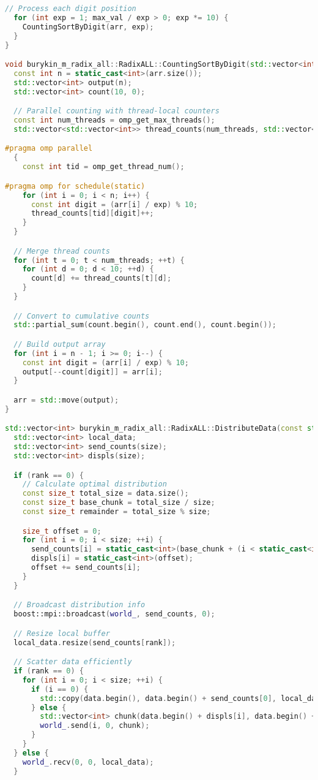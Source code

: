 \documentclass[12pt]{article}
\begin{document}
\begin{lstlisting}[language=C++]
  // Process each digit position
  for (int exp = 1; max_val / exp > 0; exp *= 10) {
    CountingSortByDigit(arr, exp);
  }
}

void burykin_m_radix_all::RadixALL::CountingSortByDigit(std::vector<int>& arr, int exp) {
  const int n = static_cast<int>(arr.size());
  std::vector<int> output(n);
  std::vector<int> count(10, 0);

  // Parallel counting with thread-local counters
  const int num_threads = omp_get_max_threads();
  std::vector<std::vector<int>> thread_counts(num_threads, std::vector<int>(10, 0));

#pragma omp parallel
  {
    const int tid = omp_get_thread_num();

#pragma omp for schedule(static)
    for (int i = 0; i < n; i++) {
      const int digit = (arr[i] / exp) % 10;
      thread_counts[tid][digit]++;
    }
  }

  // Merge thread counts
  for (int t = 0; t < num_threads; ++t) {
    for (int d = 0; d < 10; ++d) {
      count[d] += thread_counts[t][d];
    }
  }

  // Convert to cumulative counts
  std::partial_sum(count.begin(), count.end(), count.begin());

  // Build output array
  for (int i = n - 1; i >= 0; i--) {
    const int digit = (arr[i] / exp) % 10;
    output[--count[digit]] = arr[i];
  }

  arr = std::move(output);
}

std::vector<int> burykin_m_radix_all::RadixALL::DistributeData(const std::vector<int>& data, int rank, int size) {
  std::vector<int> local_data;
  std::vector<int> send_counts(size);
  std::vector<int> displs(size);

  if (rank == 0) {
    // Calculate optimal distribution
    const size_t total_size = data.size();
    const size_t base_chunk = total_size / size;
    const size_t remainder = total_size % size;

    size_t offset = 0;
    for (int i = 0; i < size; ++i) {
      send_counts[i] = static_cast<int>(base_chunk + (i < static_cast<int>(remainder) ? 1 : 0));
      displs[i] = static_cast<int>(offset);
      offset += send_counts[i];
    }
  }

  // Broadcast distribution info
  boost::mpi::broadcast(world_, send_counts, 0);

  // Resize local buffer
  local_data.resize(send_counts[rank]);

  // Scatter data efficiently
  if (rank == 0) {
    for (int i = 0; i < size; ++i) {
      if (i == 0) {
        std::copy(data.begin(), data.begin() + send_counts[0], local_data.begin());
      } else {
        std::vector<int> chunk(data.begin() + displs[i], data.begin() + displs[i] + send_counts[i]);
        world_.send(i, 0, chunk);
      }
    }
  } else {
    world_.recv(0, 0, local_data);
  }


\end{lstlisting}
\end{document}

